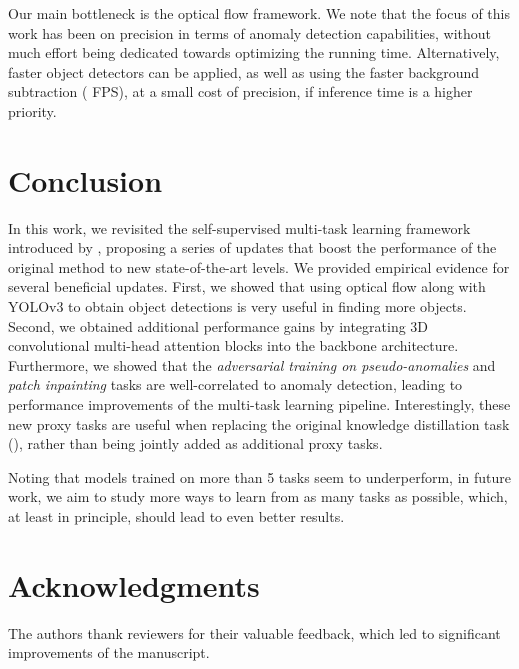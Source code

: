 \documentclass[times,twocolumn,final,authoryear]{elsarticle}
\begin{document}
Our main bottleneck is the optical flow framework. We note that the focus of this work has been on precision in terms of anomaly detection capabilities, without much effort being dedicated towards optimizing the running time. Alternatively, faster object detectors can be applied, as well as using the faster background subtraction ( FPS), at a small cost of precision, if inference time is a higher priority.

\section{Conclusion}

In this work, we revisited the self-supervised multi-task learning framework introduced by \cite{Georgescu-CVPR-2021}, proposing a series of updates that boost the performance of the original method to new state-of-the-art levels. We provided empirical evidence for several beneficial updates. First, we showed that using optical flow along with YOLOv3 to obtain object detections is very useful in finding more objects. Second, we obtained additional performance gains by integrating 3D convolutional multi-head attention blocks into the backbone architecture. Furthermore, we showed that the \emph{adversarial training on pseudo-anomalies} and \emph{patch inpainting} tasks are well-correlated to anomaly detection, leading to performance improvements of the multi-task learning pipeline. Interestingly, these new proxy tasks are useful when replacing the original knowledge distillation task (), rather than being jointly added as additional proxy tasks. 

Noting that models trained on more than 5 tasks seem to underperform, in future work, we aim to study more ways to learn from as many tasks as possible, which, at least in principle, should lead to even better results.

\section*{Acknowledgments}

The authors thank reviewers for their valuable feedback, which led to significant improvements of the manuscript.
\end{document}
